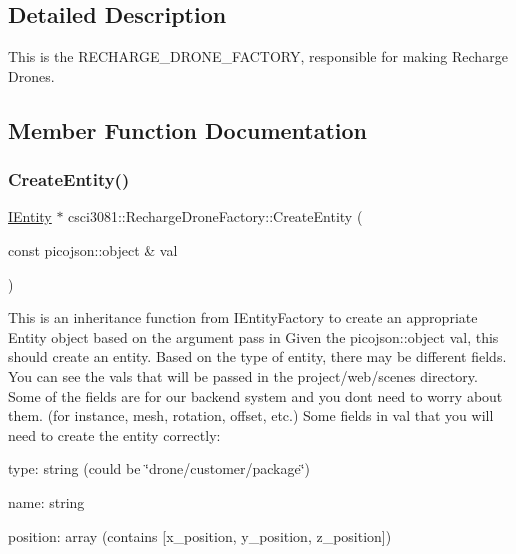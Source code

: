 \subsection{Detailed Description}
This is the R\+E\+C\+H\+A\+R\+G\+E\+\_\+\+D\+R\+O\+N\+E\+\_\+\+F\+A\+C\+T\+O\+RY, responsible for making Recharge Drones. 

\subsection{Member Function Documentation}
\mbox{\label{classcsci3081_1_1RechargeDroneFactory_ab6da0dbaa91fb44d3ae1ebaefeb07091}} 
\subsubsection{\texorpdfstring{Create\+Entity()}{CreateEntity()}}
{\footnotesize\ttfamily \hyperlink{classentity__project_1_1IEntity}{I\+Entity} $\ast$ csci3081\+::\+Recharge\+Drone\+Factory\+::\+Create\+Entity (\begin{DoxyParamCaption}\item[{const picojson\+::object \&}]{val }\end{DoxyParamCaption})\hspace{0.3cm}{\ttfamily [virtual]}}



This is an inheritance function from I\+Entity\+Factory to create an appropriate Entity object based on the argument pass in Given the picojson\+::object val, this should create an entity. Based on the type of entity, there may be different fields. You can see the vals that will be passed in the project/web/scenes directory. Some of the fields are for our backend system and you don\textquotesingle{}t need to worry about them. (for instance, mesh, rotation, offset, etc.) Some fields in val that you will need to create the entity correctly\+: 

type\+: string (could be \char`\"{}drone/customer/package\char`\"{})

name\+: string

position\+: array (contains \mbox{[}x\+\_\+position, y\+\_\+position, z\+\_\+position\mbox{]})

